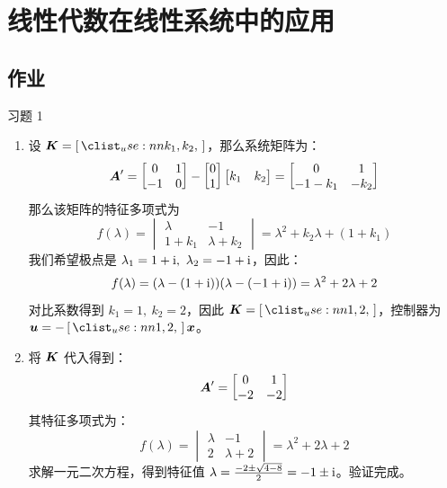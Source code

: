 \section{线性代数在线性系统中的应用}

\subsection{作业}

\begin{problem}
	习题 1
	\begin{solution}
		\begin{enumerate}
			\item[\textbf{1)}] 设 $\matr{K} = \rvec{k_1, k_2}$，那么系统矩阵为：
			$$
			\boldsymbol{A}' = \begin{bmatrix}
				0 & 1 \\
				-1 & 0 
			\end{bmatrix} - \begin{bmatrix}
				0 \\
				1 
			\end{bmatrix} \begin{bmatrix}
				k_1 & k_2 
			\end{bmatrix} = \begin{bmatrix}
				0 & 1 \\
				-1 - k_1 & -k_2 
			\end{bmatrix}
			$$
			那么该矩阵的特征多项式为
			$$
			f(\lambda) = \begin{vmatrix}
				\lambda & -1 \\
				1 + k_1 & \lambda + k_2
			\end{vmatrix} = \lambda^2 + k_2 \lambda + (1 + k_1)
			$$
			我们希望极点是 $\lambda_1 = 1 + \mathrm{i},\ \lambda_2 = -1 + \mathrm{i}$，因此：
			$$
			f(\lambda) = (\lambda - (1 + \mathrm{i})) (\lambda - (-1 + \mathrm{i})) = \lambda^2 + 2\lambda + 2
			$$
			对比系数得到 $k_1 = 1,\ k_2 = 2$，因此 $\matr{K} = \rvec{1, 2}$，控制器为 $\vect{u} = -\rvec{1, 2} \vect{x}$。

			\item[\textbf{2)}] 将 $\boldsymbol{K}$ 代入得到：
			$$
			\boldsymbol{A}' = \begin{bmatrix}
				0 & 1 \\
				-2 & -2 
			\end{bmatrix}
			$$
			其特征多项式为：
			$$
			f(\lambda) = \begin{vmatrix}
				\lambda & -1 \\
				2 & \lambda + 2 
			\end{vmatrix} = \lambda^2 + 2 \lambda + 2
			$$
			求解一元二次方程，得到特征值 $\lambda = \frac{-2 \pm \sqrt{4 - 8}}{2} = -1 \pm \mathrm{i}$。验证完成。


\end{enumerate}
\end{solution}
\end{problem}
